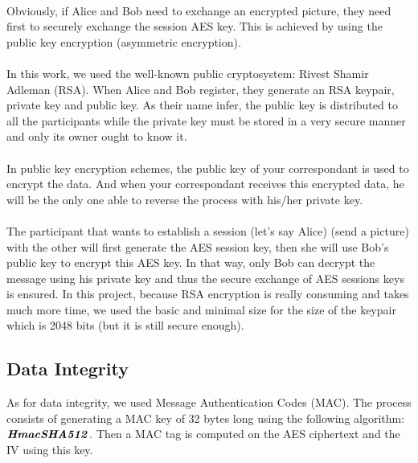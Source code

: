 	\paragraph{}
	  Obviously, if Alice and Bob need to exchange an encrypted picture, they need first to securely exchange the session AES key. This is achieved by using the public key encryption (asymmetric encryption).
	  \paragraph{}
	    In this work, we used the well-known public cryptosystem: Rivest Shamir Adleman (RSA). When Alice and Bob register, they generate an RSA keypair, private key and public key. As their name infer, the public key is distributed to all the participants while the private key must be stored in a very secure manner and only its owner ought to know it.
	  \paragraph{}
	    In public key encryption schemes, the public key of your correspondant is used to encrypt the data. And when your correspondant receives this encrypted data, he will be the only one able to reverse the process with his/her private key.
	  \paragraph{}
	    The participant that wants to establish a session (let's say Alice) (send a picture) with the other will first generate the AES session key, then she will use Bob's public key to encrypt this AES key. In that way, only Bob can decrypt the message using his private key and thus the secure exchange of AES sessions keys is ensured. In this project, because RSA encryption is really consuming and takes much more time, we used the basic and minimal size for the size of the keypair which is 2048 bits (but it is still secure enough).

	
      \subsection{Data Integrity}
      
	As for data integrity, we used Message Authentication Codes (MAC). The process consists of generating a MAC key of 32 bytes long using the following algorithm: $\textbf{\textit{HmacSHA512}}$.
	Then a MAC tag is computed on the AES ciphertext and the IV using this key.
	
